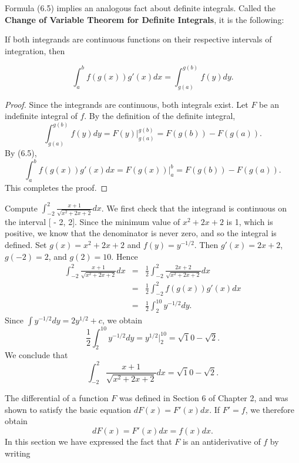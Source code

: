 Formula (6.5) implies an analogous fact about definite integrals. Called the \textbf{Change of Variable Theorem for Definite Integrals}, it is the following:

\begin{theorem} %
If both integrands are continuous functions on their respective intervals of integration, then

$$
\int_{a}^{b} f (g(x))g'(x) dx = \int_{g(a)}^{g(b)} f (y) dy.
$$
\end{theorem}

\begin{proof}
Since the integrands are continuous, both integrals exist. Let $F$ be an indefinite integral of $f$. By the definition of the definite integral,
$$
\int_{g(a)}^{g(b)} f(y) dy = F(y) \Big|_{g(a)}^{g(b)} = F(g(b)) - F(g(a)).
$$
By (6.5),
$$
\int_{a}^{b} f(g(x))g'(x)dx = F(g(x)) \Big|_{a}^{b} = F(g(b)) - F(g(a)).
$$
This completes the proof.
\end{proof}

\begin{example}
Compute $\int_{-2}^{2} \frac{x + 1}{\sqrt{x^2 + 2x + 2}} dx$. We first check that the integrand is continuous on the interval [ - 2, 2]. Since the minimum value of $x^2 + 2x + 2$ is 1, which is positive, we know that the denominator is never zero, and so the integral is defined. Set $g(x) = x^2 + 2x + 2$ and $f (y) = y^{-1/2}$. Then $g'(x) = 2x + 2$, $g(- 2) = 2$, and $g(2) = 10$.  Hence
\begin{eqnarray*}
\int_{-2}^{2} \frac{x + 1}{\sqrt{x^2 +  2x + 2}}  dx 
&=& \frac{1}{2} \int_{-2}^{2} \frac{2x + 2}{\sqrt{x^2 + 2x + 2}} dx \\
&=& \frac{1}{2} \int_{-2}^{2}  f(g(x))g'(x)dx\\
&=& \frac{1}{2}\int_{2}^{10} y^{-1/2} dy.
\end{eqnarray*}
Since $\int y^{-1/2} dy = 2y^{1/2} + c$, we obtain  
$$
\frac{1}{2} \int_{2}^{10} y^{-1/2} dy = y^{1/2} \Big|_{2}^{10} = \sqrt 10 -\sqrt 2.
$$
We conclude that 
$$
\int_{-2}^{2} \frac{x+1}{\sqrt{x^2 + 2x +2}} dx = \sqrt 10 -\sqrt 2.
$$
\end{example}

The differential of a function $F$ was defined in Section 6 of Chapter 2,
and was shown to satisfy the basic equation $dF(x) = F'(x) dx$.
If $F' = f$, we therefore obtain 
\begin{equation}
dF(x) = F'(x) dx = f (x) dx.
\label{eq4.6.3}
\end{equation}
In this section we have expressed the fact that $F$ is an antiderivative of $f$ by writing  

